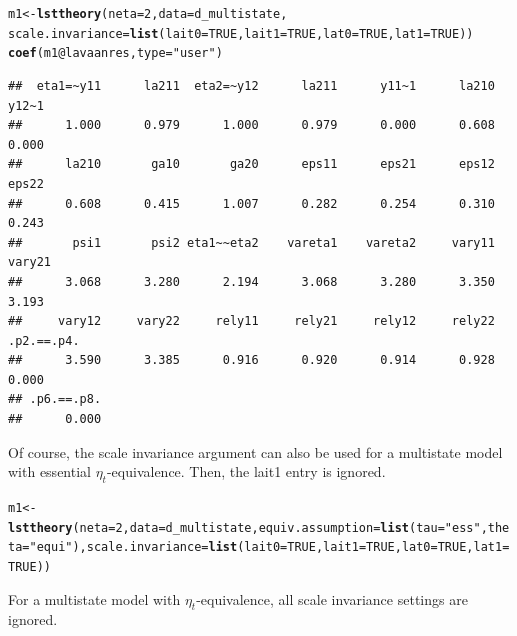 \documentclass[10pt]{article}\usepackage[]{graphicx}\usepackage[]{xcolor}
\makeatletter
\newcommand{\hlnum}[1]{\textcolor[rgb]{0.686,0.059,0.569}{#1}}%
\newcommand{\hlstr}[1]{\textcolor[rgb]{0.192,0.494,0.8}{#1}}%
\newcommand{\hlopt}[1]{\textcolor[rgb]{0,0,0}{#1}}%
\newcommand{\hlstd}[1]{\textcolor[rgb]{0.345,0.345,0.345}{#1}}%
\newcommand{\hlkwb}[1]{\textcolor[rgb]{0.69,0.353,0.396}{#1}}%
\newcommand{\hlkwc}[1]{\textcolor[rgb]{0.333,0.667,0.333}{#1}}%
\newcommand{\hlkwd}[1]{\textcolor[rgb]{0.737,0.353,0.396}{\textbf{#1}}}%
\newenvironment{kframe}{%
 \def\at@end@of@kframe{}%
 \ifinner\ifhmode%
  \def\at@end@of@kframe{\end{minipage}}%
  \begin{minipage}{\columnwidth}%
 \fi\fi%
 \def\FrameCommand##1{\hskip\@totalleftmargin \hskip-\fboxsep
 \colorbox{shadecolor}{##1}\hskip-\fboxsep
     \hskip-\linewidth \hskip-\@totalleftmargin \hskip\columnwidth}%
 \MakeFramed {\advance\hsize-\width
   \@totalleftmargin\z@ \linewidth\hsize
   \@setminipage}}%
 {\par\unskip\endMakeFramed%
 \at@end@of@kframe}
\newenvironment{knitrout}{}{} %
\makeatother
\begin{document}
%
\begin{knitrout}
\color{fgcolor}\begin{kframe}
\begin{alltt}
\hlstd{m1} \hlkwb{<-} \hlkwd{lsttheory}\hlstd{(}\hlkwc{neta}\hlstd{=}\hlnum{2}\hlstd{,} \hlkwc{data}\hlstd{=d_multistate,}
                \hlkwc{scale.invariance}\hlstd{=}\hlkwd{list}\hlstd{(}\hlkwc{lait0}\hlstd{=}\hlnum{TRUE}\hlstd{,} \hlkwc{lait1}\hlstd{=}\hlnum{TRUE}\hlstd{,} \hlkwc{lat0}\hlstd{=}\hlnum{TRUE}\hlstd{,} \hlkwc{lat1}\hlstd{=}\hlnum{TRUE}\hlstd{))}
\hlkwd{coef}\hlstd{(m1}\hlopt{@}\hlkwc{lavaanres}\hlstd{,} \hlkwc{type}\hlstd{=}\hlstr{"user"}\hlstd{)}
\end{alltt}
\begin{verbatim}
##  eta1=~y11      la211  eta2=~y12      la211      y11~1      la210      y12~1 
##      1.000      0.979      1.000      0.979      0.000      0.608      0.000 
##      la210       ga10       ga20      eps11      eps21      eps12      eps22 
##      0.608      0.415      1.007      0.282      0.254      0.310      0.243 
##       psi1       psi2 eta1~~eta2    vareta1    vareta2     vary11     vary21 
##      3.068      3.280      2.194      3.068      3.280      3.350      3.193 
##     vary12     vary22     rely11     rely21     rely12     rely22 .p2.==.p4. 
##      3.590      3.385      0.916      0.920      0.914      0.928      0.000 
## .p6.==.p8. 
##      0.000
\end{verbatim}
\end{kframe}
\end{knitrout}
%
Of course, the scale invariance argument can also be used for a multistate model with essential $\eta_t$-equivalence. Then, the lait1 entry is ignored.
%
\begin{knitrout}
\color{fgcolor}\begin{kframe}
\begin{alltt}
\hlstd{m1} \hlkwb{<-} \hlkwd{lsttheory}\hlstd{(}\hlkwc{neta}\hlstd{=}\hlnum{2}\hlstd{,} \hlkwc{data}\hlstd{=d_multistate,} \hlkwc{equiv.assumption}\hlstd{=}\hlkwd{list}\hlstd{(}\hlkwc{tau}\hlstd{=}\hlstr{"ess"}\hlstd{,} \hlkwc{theta}\hlstd{=}\hlstr{"equi"}\hlstd{),} \hlkwc{scale.invariance}\hlstd{=}\hlkwd{list}\hlstd{(}\hlkwc{lait0}\hlstd{=}\hlnum{TRUE}\hlstd{,} \hlkwc{lait1}\hlstd{=}\hlnum{TRUE}\hlstd{,} \hlkwc{lat0}\hlstd{=}\hlnum{TRUE}\hlstd{,} \hlkwc{lat1}\hlstd{=}\hlnum{TRUE}\hlstd{))}
\end{alltt}
\end{kframe}
\end{knitrout}
%
For a multistate model with $\eta_t$-equivalence, all scale invariance settings are ignored.
\end{document}
